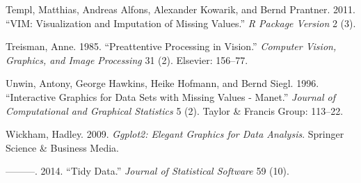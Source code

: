 \documentclass[]{article}
\begin{document}
\hypertarget{ref-vim}{}
Templ, Matthias, Andreas Alfons, Alexander Kowarik, and Bernd Prantner.
2011. ``VIM: Visualization and Imputation of Missing Values.'' \emph{R
Package Version} 2 (3).

\hypertarget{ref-treisman1985}{}
Treisman, Anne. 1985. ``Preattentive Processing in Vision.''
\emph{Computer Vision, Graphics, and Image Processing} 31 (2). Elsevier:
156--77.

\hypertarget{ref-Unwin1996}{}
Unwin, Antony, George Hawkins, Heike Hofmann, and Bernd Siegl. 1996.
``Interactive Graphics for Data Sets with Missing Values - Manet.''
\emph{Journal of Computational and Graphical Statistics} 5 (2). Taylor
\& Francis Group: 113--22.

\hypertarget{ref-wickham2009ggplot2}{}
Wickham, Hadley. 2009. \emph{Ggplot2: Elegant Graphics for Data
Analysis}. Springer Science \& Business Media.

\hypertarget{ref-wickham2014}{}
---------. 2014. ``Tidy Data.'' \emph{Journal of Statistical Software}
59 (10).
\end{document}
